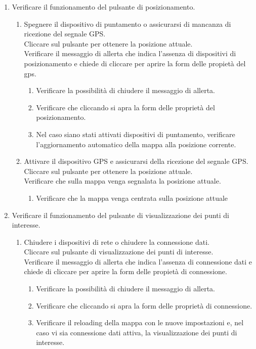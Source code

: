 \begin{enumerate}
\item Verificare il funzionamento del pulsante di posizionamento.
\begin{enumerate}
\item Spegnere il dispositivo di puntamento o assicurarsi di mancanza di ricezione del segnale GPS. \\Cliccare sul pulsante per ottenere la posizione attuale. \\Verificare il messaggio di allerta che indica l'assenza di dispositivi di posizionamento e chiede di cliccare per aprire la form delle propietà del gps. 
\begin{enumerate}
\item Verificare la possibilità di chiudere il messaggio di allerta.
\item Verificare che cliccando si apra la form delle proprietà del posizionamento.
\item Nel caso siano stati attivati dispositivi di puntamento, verificare l'aggiornamento automatico della mappa alla posizione corrente.
\end{enumerate}
\item Attivare il dispositivo GPS e assicurarsi della ricezione del segnale GPS. \\Cliccare sul pulsante per ottenere la posizione attuale. \\Verificare che sulla mappa venga segnalata la posizione attuale.
\begin{enumerate}
\item Verificare che la mappa venga centrata sulla posizione attuale
\end{enumerate}
\end{enumerate}

\item Verificare il funzionamento del pulsante di visualizzazione dei punti di interesse.
\begin{enumerate}
\item Chiudere i dispositivi di rete o chiudere la connessione dati. \\Cliccare sul pulsante di visualizzazione dei punti di interesse.\\ Verificare il messaggio di allerta che indica l'assenza di connessione dati e chiede di cliccare per aprire la form delle propietà di connessione.
\begin{enumerate}
\item Verificare la possibilità di chiudere il messaggio di allerta.
\item Verificare che cliccando si apra la form delle proprietà di connessione.
\item Verificare il reloading della mappa con le nuove impostazioni e, nel caso vi sia connessione dati attiva, la visualizzazione dei punti di interesse.
\end{enumerate}


\end{enumerate}
\end{enumerate}
